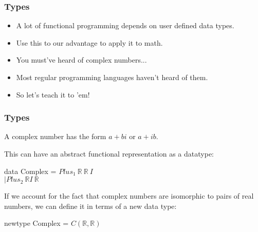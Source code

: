 \documentclass[handout]{beamer}
\newcommand{\R}{\mathbb{R}}
\begin{document}
    \begin{frame}
        \frametitle{Types}

        \begin{itemize}
            \item A lot of functional programming depends on user defined data types.
            \item Use this to our advantage to apply it to math.
            \item<2-> You must've heard of complex numbers...
            \item<3-> Most regular programming languages haven't heard of them.
            \item<4-> So let's teach it to 'em!
        \end{itemize}
    \end{frame}

    \begin{frame}[fragile]
        \frametitle{Types}

        A complex number has the form $a + bi$ or $a + ib$.

        This can have an abstract functional representation as a datatype:

        data Complex = $Plus_1\ \R\ \R\ I$\\
        \quad \quad \quad \quad \quad \quad \quad $| Plus_2\ \R I\ \R$

        \vspace{10px}

        If we account for the fact that complex numbers are isomorphic to pairs of real numbers, we can define it in terms of a new data type:

        newtype Complex = $C (\R, \R)$
    \end{frame}
\end{document}
